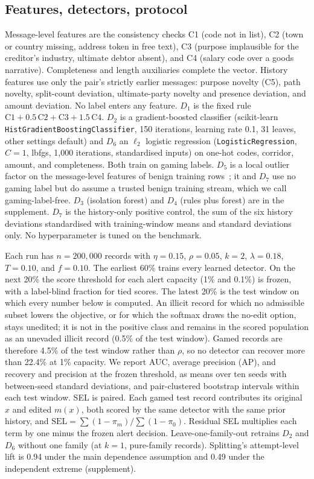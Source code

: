 \documentclass[conference]{IEEEtran}
\begin{document}
\subsection{Features, detectors, protocol}
Message-level features are the consistency checks C1 (code not in list), C2
(town or country missing, address token in free text), C3 (purpose
implausible for the creditor's industry, ultimate debtor absent), and C4
(salary code over a goods narrative). Completeness and length auxiliaries
complete the vector.
History features use only the pair's strictly earlier messages: purpose
novelty (C5), path novelty, split-count deviation, ultimate-party novelty and
presence deviation, and amount deviation. No label enters any feature. $D_1$
is the fixed rule $\mathrm{C1}+0.5\,\mathrm{C2}+\mathrm{C3}+1.5\,\mathrm{C4}$.
$D_2$ is a gradient-boosted classifier (scikit-learn
\texttt{HistGradientBoostingClassifier}, 150 iterations, learning rate 0.1,
31 leaves, other settings default) and $D_6$ an $\ell_2$ logistic regression
(\texttt{LogisticRegression}, $C=1$, lbfgs, 1,000 iterations, standardised
inputs) on one-hot codes, corridor, amount, and completeness. Both train on
gaming labels. $D_5$ is a local outlier factor on the message-level features of
benign training rows~\cite{breunig2000}; it and $D_7$ use no gaming label but
do assume a trusted benign training stream, which we call gaming-label-free. $D_3$ (isolation forest) and $D_4$
(rules plus forest) are in the supplement. $D_7$ is the history-only positive
control, the sum of the six history deviations standardised with
training-window means and standard deviations only. No
hyperparameter is tuned on the benchmark.

Each run has $n=200{,}000$ records with $\eta=0.15$, $\rho=0.05$, $k=2$,
$\lambda=0.18$, $T=0.10$, and $f=0.10$. The earliest 60\% trains every
learned detector. On the next 20\% the score threshold for each alert capacity (1\%
and 0.1\%) is frozen, with a label-blind fraction for tied scores. The latest
20\% is the test window on which every number below is computed. An illicit record for which no admissible subset lowers the objective, or
for which the softmax draws the no-edit option, stays unedited; it is not in
the positive class and remains in the scored population as an unevaded
illicit record (0.5\% of the test window). Gamed records
are therefore 4.5\% of the test window rather than $\rho$, so no
detector can recover more than 22.4\% at 1\% capacity. We report AUC, average precision
(AP), and recovery and precision at the frozen threshold, as means over ten
seeds with between-seed standard deviations, and pair-clustered bootstrap
intervals within each test window. SEL is paired. Each gamed test record
contributes its original $x$ and edited $m(x)$, both scored by the same
detector with the same prior history, and
$\mathrm{SEL}=\sum(1-\pi_m)/\sum(1-\pi_0)$. Residual SEL multiplies each
term by one minus the frozen alert decision. Leave-one-family-out retrains
$D_2$ and $D_6$ without one family (at $k=1$, pure-family records).
Splitting's attempt-level lift is 0.94 under the main dependence
assumption and 0.49 under the independent extreme
(supplement).
\end{document}
